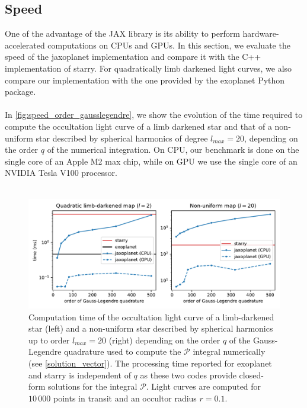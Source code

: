 \documentclass[modern]{aastex631}
\begin{document}
\subsection{Speed}\label{speed}

One of the advantage of the \textsf{JAX} library is its ability to perform hardware-accelerated computations on CPUs and GPUs. In this section, we evaluate the speed of the \textsf{jaxoplanet} implementation and compare it with the C++ implementation of \textsf{starry}. For quadratically limb darkened light curves, we also compare our implementation with the one provided by the \textsf{exoplanet} Python package.\\\\
In \autoref{fig:speed_order_gausslegendre}, we show the evolution of the time required to compute the occultation light curve of a limb darkened star and that of a non-uniform star described by spherical harmonics of degree $l_{max}=20$, depending on the order $q$ of the numerical integration. On CPU, our benchmark is done on the single core of an Apple M2 max chip, while on GPU we use the single core of an NVIDIA Tesla V100 processor.\\\\
\begin{figure}[H]
    \begin{center}
        \includegraphics[width=\textwidth]{../workflows/speed/figures/speed_vs_order.pdf}
        \caption{Computation time of the occultation light curve of a limb-darkened star (left) and a non-uniform star described by spherical harmonics up to order $l_{max}=20$ (right) depending on the order $q$ of the Gauss-Legendre quadrature used to compute the $\mathcal{P}$ integral numerically (see \autoref{solution_vector}). The processing time reported for \textsf{exoplanet} and \textsf{starry} is independent of $q$ as these two codes provide closed-form solutions for the integral $\mathcal{P}$. Light curves are computed for $10\,000$ points in transit and an occultor radius $r=0.1$.}
        \label{fig:speed_order_gausslegendre}
    \end{center}
\end{figure}
\end{document}
